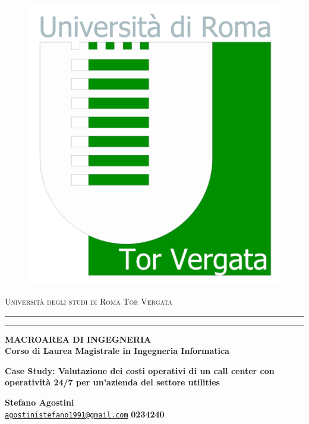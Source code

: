 \documentclass[12pt,a4paper]{report}
\begin{document}
\begin{titlepage}
\begin{figure}[htbp]
\centering
\includegraphics[scale=.2]{LOGOATENEO.jpg}
\end{figure}
\begin{center}
{{\Large{\textsc{Universit\`a degli studi di Roma Tor Vergata}}}} \rule[0.1cm]{15.8cm}{0.1mm}
\rule[0.5cm]{15.8cm}{0.6mm}
{\small{\bf MACROAREA DI INGEGNERIA\\
Corso di Laurea Magistrale in Ingegneria Informatica}}
\end{center}
\vspace{15mm}
\begin{center}
{\large{\bf Case Study: Valutazione dei costi operativi di un call center con operativit\`a 24/7 per un'azienda del settore utilities}}\\
\end{center}
\vspace{10mm}
\par
\vspace{10mm}
\par
\noindent
\begin{minipage}[t]{0.78\textwidth} 
{\large{ \bf Stefano Agostini} \\ \href{mailto:agostinistefano1991@gmail.com}{\texttt{\texttt{agostinistefano1991@gmail.com}}} \hfill \large{ \bf 0234240 }\\ 
}
\end{minipage}
\end{titlepage}
\end{document}
